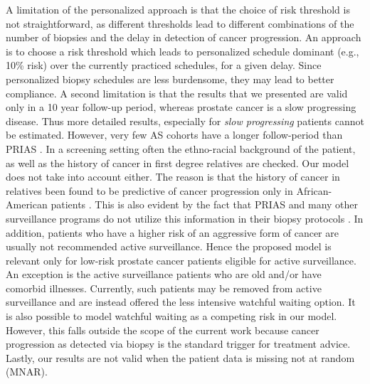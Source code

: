 \documentclass[Afour,sagev,times]{sagej}
\begin{document}
A limitation of the personalized approach is that the choice of risk threshold is not straightforward, as different thresholds lead to different combinations of the number of biopsies and the delay in detection of cancer progression. An approach is to choose a risk threshold which leads to personalized schedule dominant (e.g., 10\% risk) over the currently practiced schedules, for a given delay. Since personalized biopsy schedules are less burdensome, they may lead to better compliance. A second limitation is that the results that we presented are valid only in a 10 year follow-up period, whereas prostate cancer is a slow progressing disease. Thus more detailed results, especially for \textit{slow progressing} patients cannot be estimated. However, very few AS cohorts have a longer follow-period than PRIAS \cite{bruinsma2016active}. In a screening setting often the ethno-racial background of the patient, as well as the history of cancer in first degree relatives are checked. Our model does not take into account either. The reason is that the history of cancer in relatives been found to be predictive of cancer progression only in African-American patients \cite{goh2013clinical,telang2017prostate}. This is also evident by the fact that PRIAS and many other surveillance programs do not utilize this information in their biopsy protocols \cite{bokhorst2016decade,nieboer2018active}. In addition, patients who have a higher risk of an aggressive form of cancer are usually not recommended active surveillance. Hence the proposed model is relevant only for low-risk prostate cancer patients eligible for active surveillance. An exception is the active surveillance patients who are old and/or have comorbid illnesses. Currently, such patients may be removed from active surveillance and are instead offered the less intensive watchful waiting \cite{bokhorst2016decade} option. It is also possible to model watchful waiting as a competing risk in our model. However, this falls outside the scope of the current work because cancer progression as detected via biopsy is the standard trigger for treatment advice. Lastly, our results are not valid when the patient data is missing not at random (MNAR).
\end{document}
